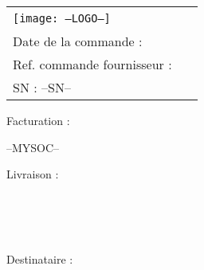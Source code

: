 \documentclass[a4paper, oneside, 10pt, french]{article}
\begin{document}
	
\begin{tabularx}{\textwidth}{X X}
    \vspace{0pt} 
    \texttt{[image: --LOGO--]}
    & 
    \vspace{0pt}
   \raggedleft
	\textcolor{violet}{\textsc{\Large \jsonTitleValue \  \jsonRefValue}}\\
	Date de la commande : \jsonDatecValue\\
	Ref. commande fournisseur : \jsonRefClientValue\\
	SN : --SN--\\
\end{tabularx}


\begin{minipage}[t]{0.40\textwidth}
{\small Facturation :}\\
\begin{fminipage}
--MYSOC--
\end{fminipage}
{\small Livraison :}\\
\begin{fminipage}
\textbf{\large \jsonShippingValueName}\\
\jsonShippingValueStreet\\ 
\textsc{\jsonShippingValueZip \ \jsonShippingValueCity}\\
\end{fminipage}
\end{minipage}
\hspace{1cm}
\begin{minipage}[t]{0.52\textwidth}
{\small Destinataire :}

\begin{fminipage}
\textbf{\large \jsonToValueName}\\
\jsonToValueAddressStreet\\
\textsc{\jsonToValueAddressZip \ \jsonToValueAddressCity}\\
\begin{minipage}{\textwidth}
\flushright
{\tiny \jsonToValueCodeClient}
\end{minipage}
\end{fminipage}
\end{minipage}
\end{document}
